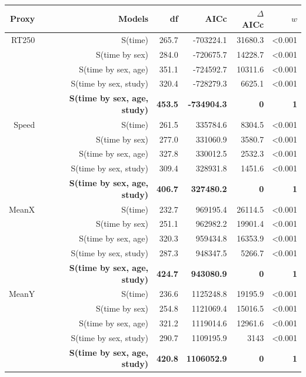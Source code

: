 \documentclass[a4paper,11pt]{article}
\begin{document}
\begin{table}[ht]
    \begin{tabular}{rrrrrr}
      \\
      \hline  
      Proxy & Models & df    & AICc  & $\Delta$AICc & $w$ \\
      \hline
      RT250 & S(time) & 265.7 & -703224.1 & 31680.3 & <0.001 \\
          & S(time by sex) & 284.0 & -720675.7 & 14228.7 & <0.001 \\
          & S(time by sex, age) & 351.1 & -724592.7 & 10311.6 & <0.001 \\
          & S(time by sex, study) & 320.4 & -728279.3 & 6625.1 & <0.001 \\
          & \textbf{S(time by sex, age, study)} & \textbf{453.5} & \textbf{-734904.3} &\textbf{0}     & \textbf{1} \\        
      \hline
      Speed & S(time) & 261.5 & 335784.6 & 8304.5 & <0.001 \\
          & S(time by sex) & 277.0 & 331060.9 & 3580.7 & <0.001 \\
          & S(time by sex, age) & 327.8 & 330012.5 & 2532.3 & <0.001 \\
          & S(time by sex, study) & 309.4 & 328931.8 & 1451.6 & <0.001 \\
          & \textbf{S(time by sex, age, study)} & \textbf{406.7} & \textbf{327480.2} & \textbf{0}     & \textbf{1} \\
      \hline
      MeanX & S(time) & 232.7 & 969195.4 & 26114.5 & <0.001 \\
          & S(time by sex) & 251.1 & 962982.2 & 19901.4 & <0.001 \\
          & S(time by sex, age) & 320.3 & 959434.8 & 16353.9 & <0.001 \\
          & S(time by sex, study) & 287.3 & 948347.5 & 5266.7 & <0.001 \\
          & \textbf{S(time by sex, age, study)} & \textbf{424.7} & \textbf{943080.9} & \textbf{0}     & \textbf{1} \\
      \hline
      MeanY & S(time) & 236.6 & 1125248.8 & 19195.9 & <0.001 \\
          & S(time by sex) & 254.8 & 1121069.4 & 15016.5 & <0.001 \\
          & S(time by sex, age) & 321.2 & 1119014.6 & 12961.6 & <0.001 \\
          & S(time by sex, study) & 290.7 & 1109195.9 & 3143  & <0.001 \\
          & \textbf{S(time by sex, age, study)} & \textbf{420.8} & \textbf{1106052.9} & \textbf{0}     & \textbf{1} \\
      \hline 
    \end{tabular}
  \end{table}
  
\end{document}
